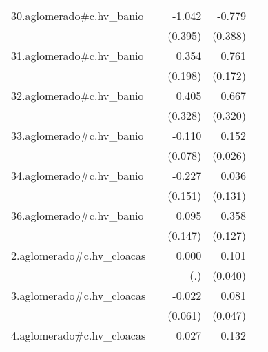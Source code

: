 {\begin{longtable}{l*{4}{D{.}{.}{-1}}}
\addlinespace
30.aglomerado#c.hv\_banio&                     &      -1.042\sym{**} &      -0.779\sym{*}  &                     \\
            &                     &     (0.395)         &     (0.388)         &                     \\
\addlinespace
31.aglomerado#c.hv\_banio&                     &       0.354         &       0.761\sym{***}&                     \\
            &                     &     (0.198)         &     (0.172)         &                     \\
\addlinespace
32.aglomerado#c.hv\_banio&                     &       0.405         &       0.667\sym{*}  &                     \\
            &                     &     (0.328)         &     (0.320)         &                     \\
\addlinespace
33.aglomerado#c.hv\_banio&                     &      -0.110         &       0.152\sym{***}&                     \\
            &                     &     (0.078)         &     (0.026)         &                     \\
\addlinespace
34.aglomerado#c.hv\_banio&                     &      -0.227         &       0.036         &                     \\
            &                     &     (0.151)         &     (0.131)         &                     \\
\addlinespace
36.aglomerado#c.hv\_banio&                     &       0.095         &       0.358\sym{**} &                     \\
            &                     &     (0.147)         &     (0.127)         &                     \\
\addlinespace
2.aglomerado#c.hv\_cloacas&                     &       0.000         &       0.101\sym{*}  &                     \\
            &                     &         (.)         &     (0.040)         &                     \\
\addlinespace
3.aglomerado#c.hv\_cloacas&                     &      -0.022         &       0.081         &                     \\
            &                     &     (0.061)         &     (0.047)         &                     \\
\addlinespace
4.aglomerado#c.hv\_cloacas&                     &       0.027         &       0.132\sym{***}&                     \\

\end{longtable}}
